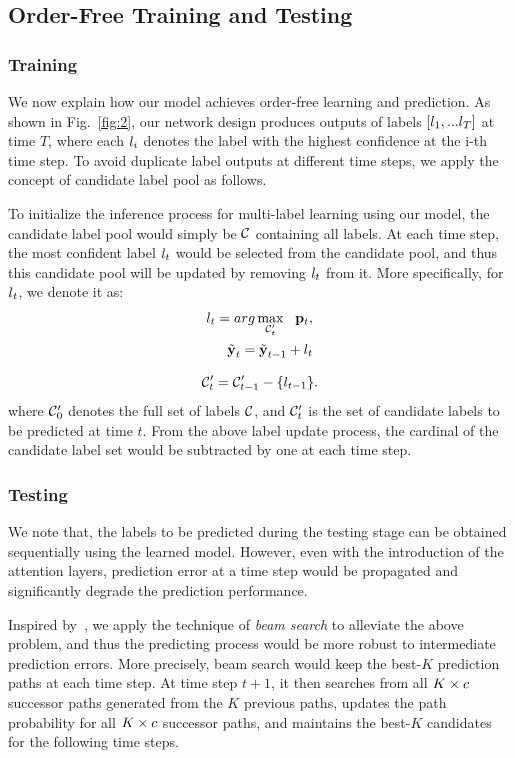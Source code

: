 \documentclass[letterpaper]{article} %
\begin{document}
\subsection{Order-Free Training and Testing}
\subsubsection{Training}

We now explain how our model achieves order-free learning and prediction. As shown in Fig.~\ref{fig:2}, our network design produces outputs of labels ${[l_1, ... l_T]}$ at time $T$, where each $l_i$ denotes the label with the highest confidence at the i-th time step. To avoid duplicate label outputs at different time steps, we apply the concept of candidate label pool as follows.

To initialize the inference process for multi-label learning using our model, the candidate label pool would simply be $\mathcal{C}$ containing all labels. At each time step, the most confident label $l_t$ would be selected from the candidate pool, and thus this candidate pool will be updated by removing $l_t$ from it. More specifically, for $l_t$, we denote it as:
\begin{equation}
\label{eq:max}
\begin{aligned}
l_t = arg\max_{\mathcal{C}'_t}~~\mathbf{p}_t, \\
\tilde{\textbf{y}}_t = \tilde{\textbf{y}}_{t-1} + l_t
\end{aligned}
\end{equation}

\begin{equation}
\label{eq:cand_pool}
\mathcal{C}'_t = \mathcal{C}'_{t-1} - \{l_{t-1}\}.
\end{equation}
where $\mathcal{C}'_0$ denotes the full set of labels $\mathcal{C}$, and $\mathcal{C}'_t$ is the set of candidate labels to be predicted at time $t$. From the above label update process, the cardinal of the candidate label set would be subtracted by one at each time step.

\subsubsection{Testing}
We note that, the labels to be predicted during the testing stage can be obtained sequentially using the learned model. However, even with the introduction of the attention layers, prediction error at a time step would be propagated and significantly degrade the prediction performance.

Inspired by~\cite{wang2016cnn}, we apply the technique of \emph{beam search} to alleviate the above problem, and thus the predicting process would be more robust to intermediate prediction errors. More precisely, beam search would keep the best-$K$ prediction paths at each time step. At time step $t+1$, it then searches from all $K\times c$ successor paths generated from the $K$ previous paths, updates the path probability for all $K\times c$ successor paths, and maintains the best-$K$ candidates for the following time steps.
\end{document}
